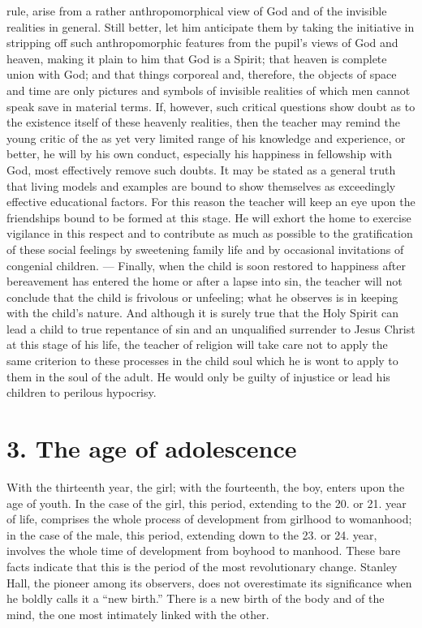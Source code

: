 rule, arise from a rather anthropomorphical view of God and of the invisible realities in general. Still better, let him anticipate them by taking the initiative in stripping off such anthropomorphic features from the pupil’s views of God and heaven, making it plain to him that God is a Spirit; that heaven is complete union with God; and that things corporeal and, therefore, the objects of space and time are only pictures and symbols of invisible realities of which men cannot speak save in material terms. If, however, such critical questions show doubt as to the existence itself of these heavenly realities, then the teacher may remind the young critic of the as yet very limited range of his knowledge and experience, or better, he will by his own conduct, especially his happiness in fellowship with God, most effectively remove such doubts. It may be stated as a general truth that living models and examples are bound to show themselves as exceedingly effective educational factors. For this reason the teacher will keep an eye upon the friendships bound to be formed at this stage. He will exhort the home to exercise vigilance in this respect and to contribute as much as possible to the gratification of these social feelings by sweetening family life and by occasional invitations of congenial children. — Finally, when the child is soon restored to happiness after bereavement has entered the home or after a lapse into sin, the teacher will not conclude that the child is frivolous or unfeeling; what he observes is in keeping with the child’s nature. And although it is surely true that the Holy Spirit can lead a child to true repentance of sin and an unqualified surrender to Jesus Christ at this stage of his life, the teacher of religion will take care not to apply the same criterion to these processes in the child soul which he is wont to apply to them in the soul of the adult. He would only be guilty of injustice or lead his children to perilous hypocrisy.

\section{3. The age of adolescence}

With the thirteenth year, the girl; with the fourteenth, the boy, enters upon the age of youth. In the case of the girl, this period, extending to the 20. or 21. year of life, comprises the whole process of development from girlhood to womanhood; in the case of the male, this period, extending down to the 23. or 24. year, involves the whole time of development from boyhood to manhood. These bare facts indicate that this is the period of the most revolutionary change. Stanley Hall, the pioneer among its observers, does not overestimate its significance when he boldly calls it a “new birth.” There is a new birth of the body and of the mind, the one most intimately linked with the other.

